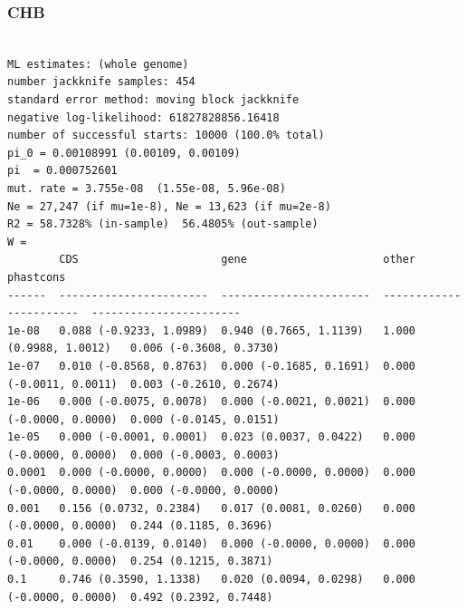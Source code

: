 \documentclass[11pt]{article}
\begin{document}
\subsubsection*{CHB}
\begin{minipage}{\linewidth}\begin{footnotesize}
\begin{verbatim}

ML estimates: (whole genome)
number jackknife samples: 454
standard error method: moving block jackknife
negative log-likelihood: 61827828856.16418
number of successful starts: 10000 (100.0% total)
pi_0 = 0.00108991 (0.00109, 0.00109)
pi  = 0.000752601
mut. rate = 3.755e-08  (1.55e-08, 5.96e-08)
Ne = 27,247 (if mu=1e-8), Ne = 13,623 (if mu=2e-8)
R2 = 58.7328% (in-sample)  56.4805% (out-sample)
W = 
        CDS                      gene                     other                    phastcons
------  -----------------------  -----------------------  -----------------------  -----------------------
1e-08   0.088 (-0.9233, 1.0989)  0.940 (0.7665, 1.1139)   1.000 (0.9988, 1.0012)   0.006 (-0.3608, 0.3730)
1e-07   0.010 (-0.8568, 0.8763)  0.000 (-0.1685, 0.1691)  0.000 (-0.0011, 0.0011)  0.003 (-0.2610, 0.2674)
1e-06   0.000 (-0.0075, 0.0078)  0.000 (-0.0021, 0.0021)  0.000 (-0.0000, 0.0000)  0.000 (-0.0145, 0.0151)
1e-05   0.000 (-0.0001, 0.0001)  0.023 (0.0037, 0.0422)   0.000 (-0.0000, 0.0000)  0.000 (-0.0003, 0.0003)
0.0001  0.000 (-0.0000, 0.0000)  0.000 (-0.0000, 0.0000)  0.000 (-0.0000, 0.0000)  0.000 (-0.0000, 0.0000)
0.001   0.156 (0.0732, 0.2384)   0.017 (0.0081, 0.0260)   0.000 (-0.0000, 0.0000)  0.244 (0.1185, 0.3696)
0.01    0.000 (-0.0139, 0.0140)  0.000 (-0.0000, 0.0000)  0.000 (-0.0000, 0.0000)  0.254 (0.1215, 0.3871)
0.1     0.746 (0.3590, 1.1338)   0.020 (0.0094, 0.0298)   0.000 (-0.0000, 0.0000)  0.492 (0.2392, 0.7448)
\end{verbatim}
\end{footnotesize}\end{minipage}
\end{document}
